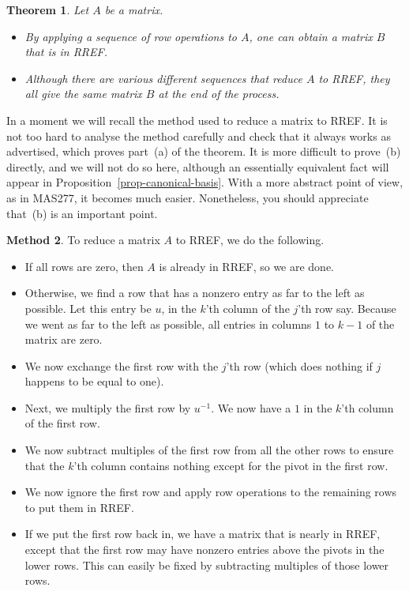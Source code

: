 \documentclass[reqno]{amsart}
\newtheorem{theorem}{Theorem}[section]
\theoremstyle{definition}
\newtheorem{method}[theorem]{Method}
\begin{document}
\begin{theorem}\label{thm-RREF}
 Let $A$ be a matrix.
 \begin{itemize}
  \item[(a)] By applying a sequence of row operations to $A$, one can
   obtain a matrix $B$ that is in RREF.
  \item[(b)] Although there are various different sequences that
   reduce $A$ to RREF, they all give the same matrix $B$ at the end of
   the process.
 \end{itemize}
\end{theorem}

In a moment we will recall the method used to reduce a matrix to RREF.
It is not too hard to analyse the method carefully and check that it
always works as advertised, which proves part~(a) of the theorem.  It
is more difficult to prove~(b) directly, and we will not do so here,
although an essentially equivalent fact will appear in
Proposition~\ref{prop-canonical-basis}.  With a more abstract point of
view, as in MAS277, it becomes much easier.  Nonetheless, you should
appreciate that~(b) is an important point.

\begin{method}\label{meth-RREF}
 To reduce a matrix $A$ to RREF, we do the following.
 \begin{itemize}
  \item[(a)] If all rows are zero, then $A$ is already in RREF, so we
   are done.
  \item[(b)] Otherwise, we find a row that has a nonzero entry as far
   to the left as possible.  Let this entry be $u$, in the $k$'th
   column of the $j$'th row say.  Because we went as far to the left
   as possible, all entries in columns $1$ to $k-1$ of the matrix are
   zero.
  \item[(c)] We now exchange the first row with the $j$'th row (which
   does nothing if $j$ happens to be equal to one).
  \item[(d)] Next, we multiply the first row by $u^{-1}$.  We now have
   a $1$ in the $k$'th column of the first row.
  \item[(e)] We now subtract multiples of the first row from all the
   other rows to ensure that the $k$'th column contains nothing except
   for the pivot in the first row.
  \item[(f)] We now ignore the first row and apply row operations to
   the remaining rows to put them in RREF.
  \item[(g)] If we put the first row back in, we have a matrix that is
   nearly in RREF, except that the first row may have nonzero entries
   above the pivots in the lower rows.  This can easily be fixed by
   subtracting multiples of those lower rows.
 \end{itemize}
\end{method}
\end{document}
